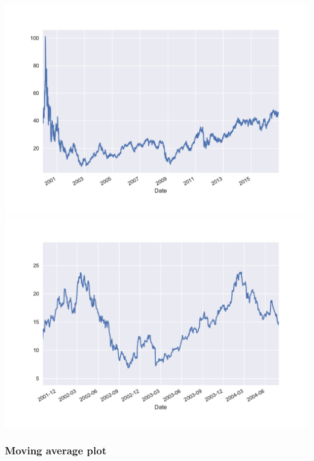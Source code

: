 \documentclass[12pt, a4paper]{article}
\begin{document}
\begin{multicols}{2}
{\centering
\includegraphics[width=\columnwidth]{src/stocks/simple/oneplot}\\
\label{fig:stock_oneplot}}
{\centering
\includegraphics[width=\columnwidth]{src/stocks/simple/oneplot_zoom}\\
\label{fig:stock_oneplot_zoom}}
\end{multicols}

\subsubsection{Moving average plot}

\bgroup
  \inputminted[linenos, breaklines=true, fontsize=\scriptsize, firstnumber=last]{python}{src/stocks/simple/3_moving_avg.py}
  \label{listing:ssimp_3}
\egroup
\end{document}
